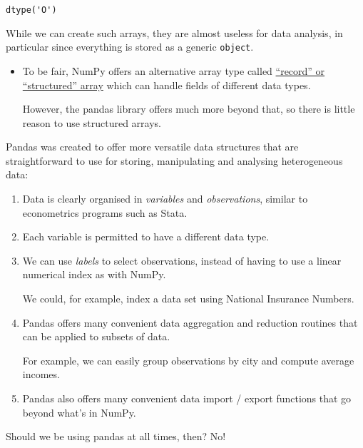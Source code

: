 \documentclass[10pt]{scrartcl}
\makeatletter
\newcommand{\boxspacing}{\kern\kvtcb@left@rule\kern\kvtcb@boxsep}
\newcommand{\prompt}[4]{
        {\ttfamily\llap{{\color{#2}[#3]:\hspace{3pt}#4}}\vspace{-\baselineskip}}
    }
\makeatother
\begin{document}
            \begin{tcolorbox}[breakable, size=fbox, boxrule=.5pt, pad at break*=1mm, opacityfill=0]
\prompt{Out}{outcolor}{2}{\boxspacing}
\begin{Verbatim}[commandchars=\\\{\}]
dtype('O')
\end{Verbatim}
\end{tcolorbox}
        
    While we can create such arrays, they are almost useless for data
analysis, in particular since everything is stored as a generic
\texttt{object}.

\begin{itemize}
\item
  To be fair, NumPy offers an alternative array type called
  \href{https://numpy.org/doc/stable/user/basics.rec.html}{``record'' or
  ``structured'' array} which can handle fields of different data types.

  However, the pandas library offers much more beyond that, so there is
  little reason to use structured arrays.
\end{itemize}

Pandas was created to offer more versatile data structures that are
straightforward to use for storing, manipulating and analysing
heterogeneous data:

\begin{enumerate}
\def\labelenumi{\arabic{enumi}.}
\item
  Data is clearly organised in \emph{variables} and \emph{observations},
  similar to econometrics programs such as Stata.
\item
  Each variable is permitted to have a different data type.
\item
  We can use \emph{labels} to select observations, instead of having to
  use a linear numerical index as with NumPy.

  We could, for example, index a data set using National Insurance
  Numbers.
\item
  Pandas offers many convenient data aggregation and reduction routines
  that can be applied to subsets of data.

  For example, we can easily group observations by city and compute
  average incomes.
\item
  Pandas also offers many convenient data import / export functions that
  go beyond what's in NumPy.
\end{enumerate}

Should we be using pandas at all times, then? No!
\end{document}
